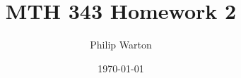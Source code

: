 \documentclass{article}
\begin{document}
\title{MTH 343 Homework 2}
\author{Philip Warton}
\date{\today}
\maketitle
\end{document}
